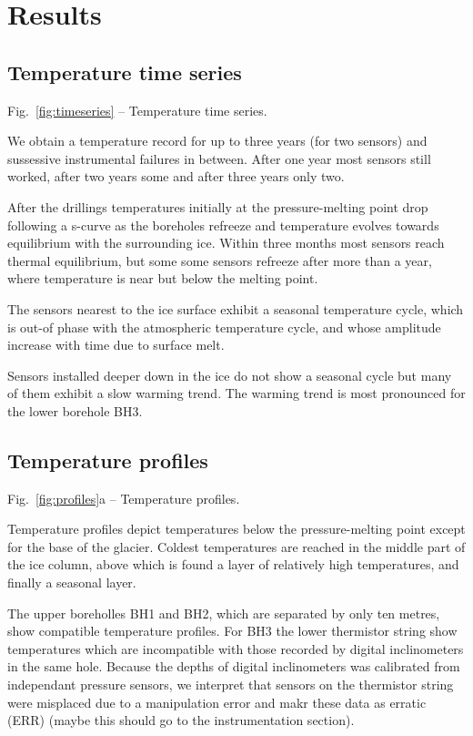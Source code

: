 \documentclass[utf8]{article}
\begin{document}
\section{Results}

\subsection{Temperature time series}

    Fig.~\ref{fig:timeseries} -- Temperature time series.

    We obtain a temperature record for up to three years (for two sensors) and
    sussessive instrumental failures in between. After one year most sensors
    still worked, after two years some and after three years only two.

    After the drillings temperatures initially at the pressure-melting point
    drop following a s-curve as the boreholes refreeze and temperature evolves
    towards equilibrium with the surrounding ice. Within three months most
    sensors reach thermal equilibrium, but some some sensors refreeze after
    more than a year, where temperature is near but below the melting point.

    The sensors nearest to the ice surface exhibit a seasonal temperature
    cycle, which is out-of phase with the atmospheric temperature cycle, and
    whose amplitude increase with time due to surface melt.

    Sensors installed deeper down in the ice do not show a seasonal cycle but
    many of them exhibit a slow warming trend. The warming trend is most
    pronounced for the lower borehole BH3.


\subsection{Temperature profiles}

    Fig.~\ref{fig:profiles}a -- Temperature profiles.

    Temperature profiles depict temperatures below the pressure-melting point
    except for the base of the glacier. Coldest temperatures are reached in the
    middle part of the ice column, above which is found a layer of relatively
    high temperatures, and finally a seasonal layer.

    The upper boreholles BH1 and BH2, which are separated by only ten metres,
    show compatible temperature profiles. For BH3 the lower thermistor string
    show temperatures which are incompatible with those recorded by digital
    inclinometers in the same hole. Because the depths of digital inclinometers
    was calibrated from independant pressure sensors, we interpret that sensors
    on the thermistor string were misplaced due to a manipulation error and
    makr these data as erratic (ERR) (maybe this should go to the
    instrumentation section).
\end{document}
